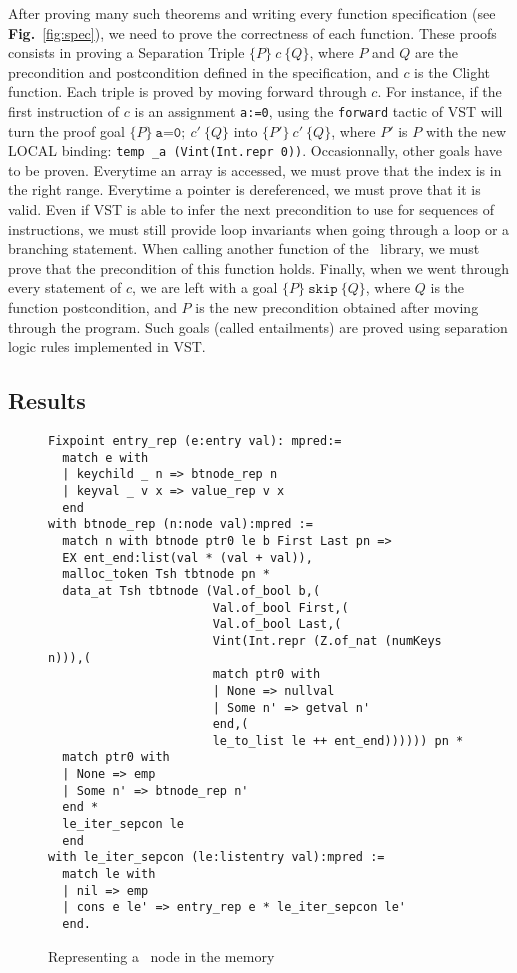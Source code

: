 After proving many such theorems and writing every function specification (see \textbf{Fig.}~\ref{fig:spec}), we need to prove the correctness of each function.
These proofs consists in proving a Separation Triple $\{P\}~c~\{Q\}$, where $P$ and $Q$ are the precondition and postcondition defined in the specification, and $c$ is the Clight function.
Each triple is proved by moving forward through $c$.
For instance, if the first instruction of $c$ is an assignment \texttt{a:=0}, using the \texttt{forward} tactic of VST will turn the proof goal $\{P\}~\texttt{a=0};~c'~\{Q\}$ into $\{P'\}~c'~\{Q\}$,
where $P'$ is $P$ with the new LOCAL binding: \texttt{temp \_a (Vint(Int.repr 0))}.
Occasionnally, other goals have to be proven.
Everytime an array is accessed, we must prove that the index is in the right range.
Everytime a pointer is dereferenced, we must prove that it is valid.
Even if VST is able to infer the next precondition to use for sequences of instructions, we must still provide loop invariants when going through a loop or a branching statement.
When calling another function of the \btrees\ library, we must prove that the precondition of this function holds.
Finally, when we went through every statement of $c$, we are left with a goal $\{P\}~\texttt{skip}~\{Q\}$, where $Q$ is the function postcondition, and $P$ is the new precondition obtained after moving through the program.
Such goals (called entailments) are proved using separation logic rules implemented in VST.

\subsection{Results}



\begin{figure}
\begin{lstlisting}
Fixpoint entry_rep (e:entry val): mpred:=
  match e with
  | keychild _ n => btnode_rep n
  | keyval _ v x => value_rep v x
  end
with btnode_rep (n:node val):mpred :=
  match n with btnode ptr0 le b First Last pn =>
  EX ent_end:list(val * (val + val)),
  malloc_token Tsh tbtnode pn *
  data_at Tsh tbtnode (Val.of_bool b,(
                       Val.of_bool First,(
                       Val.of_bool Last,(
                       Vint(Int.repr (Z.of_nat (numKeys n))),(
                       match ptr0 with
                       | None => nullval
                       | Some n' => getval n'
                       end,(
                       le_to_list le ++ ent_end)))))) pn *
  match ptr0 with
  | None => emp
  | Some n' => btnode_rep n'
  end *
  le_iter_sepcon le
  end
with le_iter_sepcon (le:listentry val):mpred :=
  match le with
  | nil => emp
  | cons e le' => entry_rep e * le_iter_sepcon le'
  end.
\end{lstlisting}
\label{fig:btnoderep}
\caption{Representing a \btree\ node in the memory}
\end{figure}


